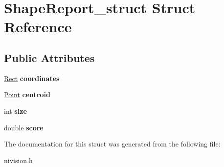 \hypertarget{structShapeReport__struct}{
\section{ShapeReport\_\-struct Struct Reference}
\label{structShapeReport__struct}
}
\subsection*{Public Attributes}
\begin{DoxyCompactItemize}
\item 
\hypertarget{structShapeReport__struct_accf2b07cae49dd5fc5c8b84e17ddad33}{
\hyperlink{structRect__struct}{Rect} {\bfseries coordinates}}
\label{structShapeReport__struct_accf2b07cae49dd5fc5c8b84e17ddad33}

\item 
\hypertarget{structShapeReport__struct_ada0450e538b571313e1a11dd8d54fbd7}{
\hyperlink{structPoint__struct}{Point} {\bfseries centroid}}
\label{structShapeReport__struct_ada0450e538b571313e1a11dd8d54fbd7}

\item 
\hypertarget{structShapeReport__struct_a7f90343d62d2b0d8cfa40b4f72195080}{
int {\bfseries size}}
\label{structShapeReport__struct_a7f90343d62d2b0d8cfa40b4f72195080}

\item 
\hypertarget{structShapeReport__struct_ab11eee47b74892f093500665fa120cdc}{
double {\bfseries score}}
\label{structShapeReport__struct_ab11eee47b74892f093500665fa120cdc}

\end{DoxyCompactItemize}


The documentation for this struct was generated from the following file:\begin{DoxyCompactItemize}
\item 
nivision.h\end{DoxyCompactItemize}
